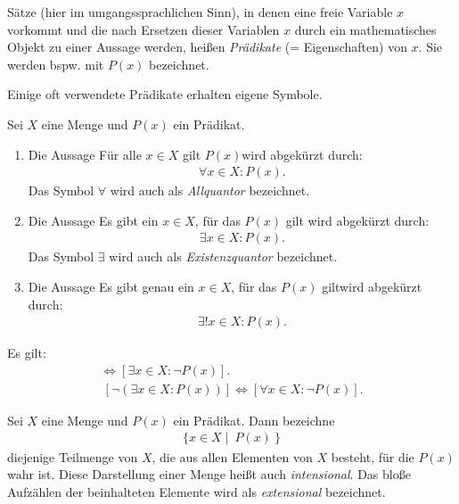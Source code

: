 \begin{mydef}
    Sätze (hier im umgangssprachlichen Sinn), in denen eine freie Variable $x$ vorkommt und die nach Ersetzen dieser Variablen $x$ durch ein mathematisches Objekt zu einer Aussage werden, 
    heißen \textit{Prädikate} (= Eigenschaften) von $x$. Sie werden bspw. mit $P(x)$ bezeichnet.
\end{mydef}

Einige oft verwendete Prädikate erhalten eigene Symbole. 

\begin{mydef}
    Sei $X$ eine Menge und $P(x)$ ein Prädikat.
    \begin{enumerate}
        \item 
        Die Aussage \glqq Für alle $x \in X$ gilt $P(x)$\grqq  wird abgekürzt durch: 
        \begin{align*}
            \forall x \in X : P(x).
        \end{align*}
        Das Symbol $\forall$ wird auch als \textit{Allquantor} bezeichnet. 
        \item 
        Die Aussage \glqq Es gibt ein $x \in X$, für das $P(x)$ gilt \grqq  wird abgekürzt durch: 
        \begin{align*}
            \exists x \in X : P(x).
        \end{align*}
        Das Symbol $\exists$ wird auch als \textit{Existenzquantor} bezeichnet. 
        \item 
        Die Aussage \glqq Es gibt genau ein $x \in X$, für das $P(x)$ gilt\grqq wird abgekürzt durch:
        \begin{align*}
            \exists ! x \in X : P(x). 
        \end{align*}
    \end{enumerate}
\end{mydef}

\begin{remark}
    Es gilt: 
    \begin{align*}
        [ \neg (\forall x \in X: P(x))] \iff [\exists x \in X: \neg P(x)]. \\\
        [ \neg (\exists x \in X: P(x))] \iff [\forall x \in X: \neg P(x)].
    \end{align*}
\end{remark}

\begin{mydef}
    Sei $X$ eine Menge und $P(x)$ ein Prädikat. Dann bezeichne 
    \begin{align*}
        \{ x \in X \mid \ P(x) \ \}
    \end{align*}
    diejenige Teilmenge von $X$, die aus allen Elementen von $X$ besteht, für die $P(x)$ wahr ist. Diese Darstellung einer Menge heißt auch \textit{intensional}. 
    Das bloße Aufzählen der beinhalteten Elemente wird als \textit{extensional} bezeichnet. 
\end{mydef}

